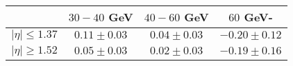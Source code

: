 \centering
\begin{tabular}{|c|c|c|c|} \hline
 & $30-40$ GeV & $40-60$ GeV & $60$ GeV-\\\hline
$\lvert \eta \rvert \leq 1.37$ & $0.11\pm0.03$ & $0.04\pm0.03$ & $-0.20\pm0.12$\\\hline
$\lvert \eta \rvert \geq 1.52$ & $0.05\pm0.03$ & $0.02\pm0.03$ & $-0.19\pm0.16$\\\hline
\end{tabular}
